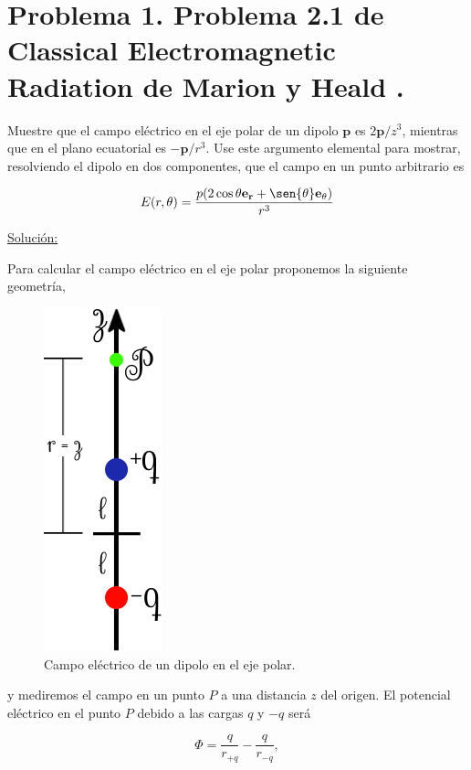 \documentclass[a4paper,11pt]{article}
\numberwithin{equation}{section}
\begin{document}
\section{Problema 1. Problema 2.1 de Classical Electromagnetic Radiation
de Marion y Heald \cite{marion2}.}

Muestre que el campo eléctrico en el eje polar de un dipolo $\mathbf{p}$ es 
$2\mathbf{p}/z^3$, mientras que en el plano ecuatorial es $-\mathbf{p}/r^3$. Use 
este argumento elemental para mostrar, resolviendo el dipolo en dos componentes, que 
el campo en un punto arbitrario es 

$$
E(r,\theta) = \frac{p(2\cos{\theta}\mathbf{e_r} + \sen{\theta}\mathbf{e_\theta})}{r^3}
$$

\vspace{.3cm}

\underline{Solución:} \vspace{.3cm}

Para calcular el campo eléctrico en el eje polar proponemos la siguiente geometría,

\begin{figure}[H]
 \center 
 \includegraphics[scale=0.5]{problema1fig1}
 \caption{Campo eléctrico de un dipolo en el eje polar.}
 \label{fig:problema1fig1}
\end{figure}

y mediremos el campo en un punto $P$ a una distancia $z$ del origen. El potencial 
eléctrico en el punto $P$ debido a las cargas $q$ y $-q$ será 

\begin{equation}
 \Phi = \frac{q}{r_{+q}} - \frac{q}{r_{-q}},
\end{equation}
\end{document}
